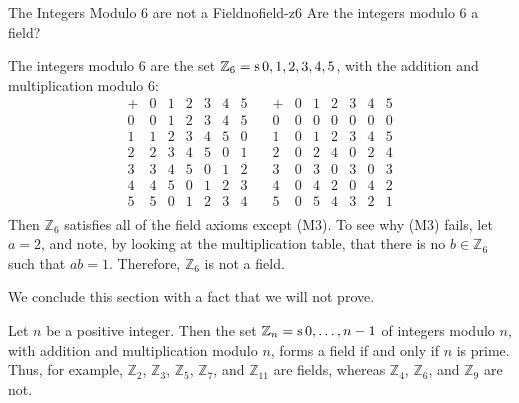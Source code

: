 \begin{example}{The Integers Modulo 6 are not a Field}{nofield-z6}
  Are the integers modulo 6 a field? 
\end{example}

\begin{solution}
  The integers modulo 6 are the set $\mathbb{Z}_6=\mathop{\textrm{s}}\nolimits{0,1,2,3,4,5}$, with the
  addition and multiplication modulo 6:
    \[ \begin{array}{l|llllll}
    +&0&1&2&3&4&5 \\\hline
    0&0&1&2&3&4&5 \\
    1&1&2&3&4&5&0 \\
    2&2&3&4&5&0&1 \\
    3&3&4&5&0&1&2 \\
    4&4&5&0&1&2&3 \\
    5&5&0&1&2&3&4 \\
  \end{array}
  \quad
  \begin{array}{l|llllll}
    +&0&1&2&3&4&5 \\\hline
    0&0&0&0&0&0&0 \\
    1&0&1&2&3&4&5 \\
    2&0&2&4&0&2&4 \\
    3&0&3&0&3&0&3 \\
    4&0&4&2&0&4&2 \\
    5&0&5&4&3&2&1 \\
  \end{array}
  \]
  Then $\mathbb{Z}_6$ satisfies all of the field axioms except
  (M3). To see why (M3) fails, let $a=2$, and note, by looking at the
  multiplication table, that there is no $b\in\mathbb{Z}_6$ such that
  $ab=1$. Therefore, $\mathbb{Z}_6$ is not a field.
\end{solution}

We conclude this section with a fact that we will not prove.

\begin{theorem}
  Let $n$ be a positive integer. Then the set
  $\mathbb{Z}_n=\mathop{\textrm{s}}\nolimits{0,\ldots,n-1}$ of integers modulo $n$, with
  addition and multiplication modulo $n$, forms a field if and only if
  $n$ is prime. Thus, for example, $\mathbb{Z}_2$, $\mathbb{Z}_3$,
  $\mathbb{Z}_5$, $\mathbb{Z}_7$, and $\mathbb{Z}_{11}$ are fields,
  whereas $\mathbb{Z}_4$, $\mathbb{Z}_6$, and $\mathbb{Z}_9$ are not.
\end{theorem}


